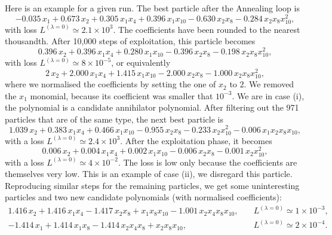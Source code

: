 \documentclass[11pt,a4paper]{article}
\begin{document}
	Here is an example for a given run. The best particle after the Annealing loop is
	 \begin{equation}
	 	-0.035\,x_{1} + 0.673\,x_{2} + 0.305\,x_{1}x_{4} + 0.396\,x_{1}x_{10} - 0.630\,x_{2}x_{8} - 0.284\,x_{2}x_{8}x_{10}^{2},
	 \end{equation}
	 with loss $L^{(\lambda = 0)} \simeq 2.1 \times 10^{3}$. The coefficients have been rounded to the nearest thousandth. After 10,000 steps of exploitation, this particle becomes
	  \begin{equation}
	 	0.396\,x_{2} + 0.396\,x_{1}x_{4} + 0.280\,x_{1}x_{10} - 0.396\,x_{2}x_{8} - 0.198\,x_{2}x_{8}x_{10}^{2},
	 \end{equation}
	 with loss $L^{(\lambda = 0)} \simeq 8 \times 10^{-5}$, or equivalently
	 \begin{equation} \label{eq:expol1}
	 	2\,x_{2} + 2.000\,x_{1}x_{4} + 1.415\,x_{1}x_{10} - 2.000\,x_{2}x_{8} - 1.000\,x_{2}x_{8}x_{10}^{2},
	 \end{equation}
	 where we normalised the coefficients by setting the one of $x_{2}$ to $2$. We removed the $x_1$ monomial, because its coefficient was smaller that $10^{-3}$. We are in case (i), the polynomial is a candidate annihilator polynomial. After filtering out the 971 particles that are of the same type, the next best particle is
	 \begin{equation}
	 	1.039\,x_{2} + 0.383\,x_{1}x_{4} + 0.466\,x_{1}x_{10} - 0.955\,x_{2}x_{8} - 0.233\,x_{2}x_{10}^{2} - 0.006\,x_{1}x_{2}x_{8}x_{10},
	 \end{equation}
	 with a loss $L^{(\lambda = 0)} \simeq 2.4 \times 10^{3}$. After the exploitation phase, it becomes
	 \begin{equation}
	 	0.006\,x_{2} + 0.004\,x_{1}x_{4} + 0.002\,x_{1}x_{10} - 0.006\,x_{2}x_{8} - 0.001\,x_{2}x_{10}^{2},
	 \end{equation}
	 with a loss $L^{(\lambda = 0)} \simeq 4 \times 10^{-2}$. The loss is low only because the coefficients are themselves very low. This is an example of case (ii), we disregard this particle. Reproducing similar steps for the remaining particles, we get some uninteresting particles and two new candidate polynomials (with normalised coefficients):
	 \begin{subequations}
	    \begin{align}
			1.416\,x_{2} + 1.416\,x_{1}x_{4} - 1.417\,x_{2}x_{8} + x_{1}x_{8}x_{10} - 1.001\,x_{2}x_{4}x_{8}x_{10},\quad &L^{(\lambda = 0)} \simeq 1 \times 10^{-3}, \label{eq:expol2}\\
			-1.414\,x_{1} + 1.414\,x_{1}x_{8} - 1.414\,x_{2}x_{4}x_{8} + x_{2}x_{8}x_{10},\quad &L^{(\lambda = 0)} \simeq 2 \times 10^{-4}. \label{eq:expol3}
		\end{align}
	\end{subequations}
\end{document}
